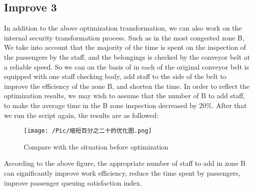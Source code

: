 \subsection{Improve 3}
In addition to the above optimization transformation, we can also work on the internal security transformation process. Such as in the most congested zone B, We take into account that the majority of the time is spent on the inspection of the passengers by the staff, and the belongings is checked by the conveyor belt at a reliable speed. So we can on the basis of in each of the original conveyor belt is equipped with one staff checking body, add staff to the side of the belt to improve the efficiency of the zone B, and shorten the time. In order to reflect the optimization results, we may wish to assume that the number of B to add staff, to make the average time in the B zone inspection decreased by 20\%. After that we run the script again, the results are as followed:

\begin{figure}[H]
\centering
\texttt{[image: /Pic/缩短百分之二十的优化图.png]}
\caption{Compare with the situation before optimization}\label{fig:Compare_Pic}
\end{figure}


According to the above figure, the appropriate number of staff to add in zone B can significantly improve work efficiency, reduce the time spent by passengers, improve passenger queuing satisfaction index.









